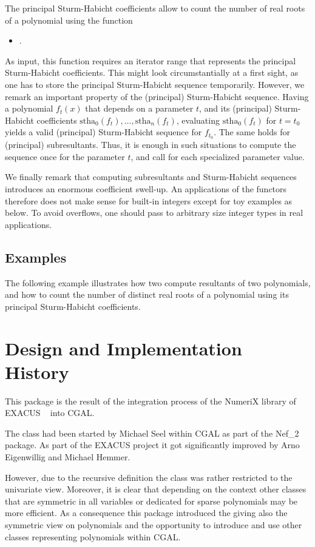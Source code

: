 The principal Sturm-Habicht coefficients allow to count the number of
real roots of a polynomial using the function
\begin{itemize}
\item {}.
\end{itemize}
As input, this function requires an iterator range that represents
the principal Sturm-Habicht coefficients. 
This might look circumstantially at a first sight,
as one has to store the principal Sturm-Habicht sequence temporarily.
However, we remark an important property of the (principal) Sturm-Habicht
sequence. Having a polynomial $f_t(x)$ that depends on a parameter $t$,
and its (principal) Sturm-Habicht coefficients 
$\mathrm{stha}_0(f_t),\ldots,\mathrm{stha}_n(f_t)$, evaluating 
$\mathrm{stha}_0(f_t)$ for $t=t_0$ yields a valid (principal)
Sturm-Habicht sequence for $f_{t_0}$. The same holds for (principal)
subresultants. Thus, it is enough in such situations to compute
the sequence once for the parameter $t$, and call 
 for each specialized parameter
value.

We finally remark that computing subresultants and Sturm-Habicht sequences
introduces an enormous coefficient swell-up.
An applications of the functors therefore does not make sense
for built-in integers except for toy examples as below.
To avoid overflows, one should pass to arbitrary size integer types
in real applications.

\subsection{Examples}

The following example illustrates how two compute resultants of two
polynomials, and how to count the number of distinct real roots
of a polynomial using its principal Sturm-Habicht coefficients.


\section{Design and Implementation History}

This package is the result of the integration process of the NumeriX library 
of EXACUS ~\cite{beh+-eeeafcs-05} into CGAL.

The class  had been started by Michael Seel within 
CGAL as part of the Nef\_2 package. As part of the EXACUS 
project it got significantly improved by Arno Eigenwillig and Michael Hemmer. 

However, due to the recursive definition the class was rather restricted to the 
univariate view. Moreover, it is clear that depending on the context 
other classes that are symmetric in all variables or dedicated 
for sparse polynomials may be more efficient. As a consequence this package 
introduced the  giving also
the symmetric view on polynomials and the opportunity to introduce and use
other classes representing polynomials within CGAL. 

 


 

